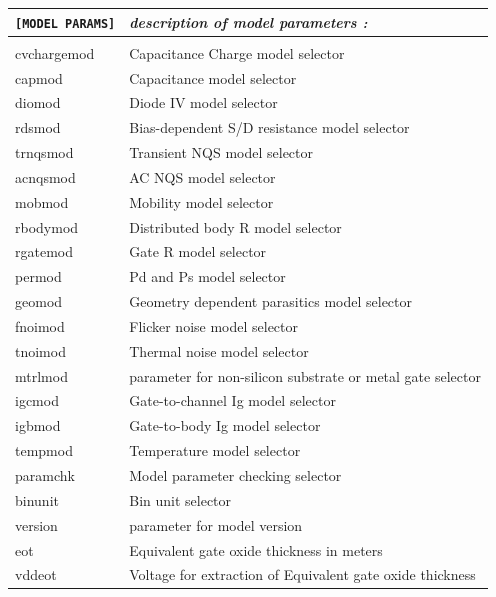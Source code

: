 \begin{longtable}{l l}		
\texttt{[MODEL PARAMS]} & \textit{description of model parameters :} \\ \hline \\ \vspace{-0.8\parskip}

{\small cvchargemod} & {\small Capacitance Charge model selector} \\
{\small capmod} & {\small Capacitance model selector} \\
{\small diomod} & {\small Diode IV model selector} \\
{\small rdsmod} & {\small Bias-dependent S/D resistance model selector} \\
{\small trnqsmod} & {\small Transient NQS model selector} \\
{\small acnqsmod} & {\small AC NQS model selector} \\
{\small mobmod} & {\small Mobility model selector} \\
{\small rbodymod} & {\small Distributed body R model selector} \\
{\small rgatemod} & {\small Gate R model selector} \\
{\small permod} & {\small Pd and Ps model selector} \\
{\small geomod} & {\small Geometry dependent parasitics model selector} \\
{\small fnoimod} & {\small Flicker noise model selector} \\
{\small tnoimod} & {\small Thermal noise model selector} \\
{\small mtrlmod} & {\small parameter for non-silicon substrate or metal gate selector} \\
{\small igcmod} & {\small Gate-to-channel Ig model selector} \\
{\small igbmod} & {\small Gate-to-body Ig model selector} \\
{\small tempmod} & {\small Temperature model selector} \\
{\small paramchk} & {\small Model parameter checking selector} \\
{\small binunit} & {\small Bin  unit  selector} \\
{\small version} & {\small parameter for model version} \\
{\small eot} & {\small Equivalent gate oxide thickness in meters} \\
{\small vddeot} & {\small Voltage for extraction of Equivalent gate oxide thickness} \\

\end{longtable}
